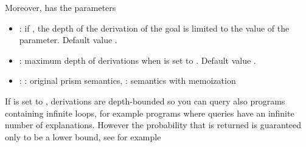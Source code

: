 \documentclass[letterpaper,10pt,english]{sphinxmanual}
\begin{document}
Moreover,  has the parameters
\begin{itemize}
\item {} 
: if , the depth of the derivation of the goal is limited to the value of the  parameter. Default value .

\item {} 
: maximum depth of derivations when  is set to . Default value .

\item {} 
: : original prism semantics, : semantics with memoization

\end{itemize}

If  is set to , derivations are depth-bounded so you can query also programs containing infinite loops, for example programs where queries have an infinite number of explanations.
However the probability that is returned is guaranteed only to be a lower bound, see for example 
\end{document}
